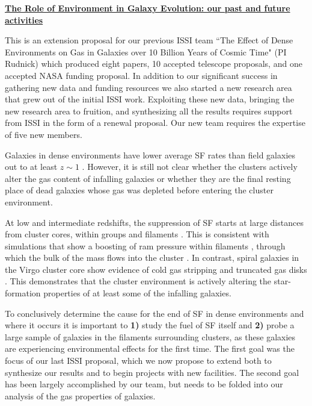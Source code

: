 \documentclass[11pt]{article}
\begin{document}
\newpage

\centerline{{\bf \underline{ The Role of Environment in Galaxy Evolution: our past and future activities}}}
\medskip

This is an extension proposal for our previous ISSI team ``The Effect of Dense Environments on Gas in Galaxies over 10 Billion Years of Cosmic Time" (PI Rudnick) which produced eight papers, 10 accepted telescope proposals, and one accepted NASA funding proposal.   In addition to our significant success in gathering new data and funding resources we also started a new research area that grew out of the initial ISSI work.  Exploiting these new data, bringing the new research area to fruition, and synthesizing all the results requires support from ISSI in the form of a renewal proposal.  Our new team requires the expertise of five new members. 

 Galaxies in dense environments
have lower average SF rates than field galaxies out
to at least $z \sim 1$ \citep[e.g.][]{Poggianti99,Lewis02,Gomez03,Postman05}.
However, it
is still not clear whether the clusters actively alter the gas content
of infalling galaxies or whether they are the final resting place of
dead galaxies whose gas was depleted before entering the cluster
environment.

At low and intermediate redshifts, the suppression of SF starts at large distances from cluster cores, within groups and filaments \citep{Lewis02,Gomez03,Laigle17}.  This is consistent with simulations that show a boosting of ram pressure within filaments \citep{Bahe13}, through which the bulk of the mass flows into the cluster \citep{Ramachandra15}. In contrast, spiral galaxies
in the Virgo cluster core show evidence of cold gas stripping and truncated
gas disks
\citep{Koopmann98,Koopmann04,Dale01,Crowl05,Chung07}.  This
demonstrates that the cluster environment is actively altering the
star-formation properties of at least some of the infalling galaxies.  

To conclusively determine the cause for the
end of SF in dense environments and where it occurs it is important to \textbf{1)} study
the fuel of SF itself and {\bf 2)} probe a large sample of galaxies in the filaments surrounding clusters, as these galaxies are experiencing environmental effects for the first time.  The first goal was the focus of our last ISSI proposal, which we now propose to extend both to synthesize our results and to begin projects with new facilities. The second goal has been largely accomplished by our team, but needs to be folded into our analysis of the gas properties of galaxies.
\end{document}
